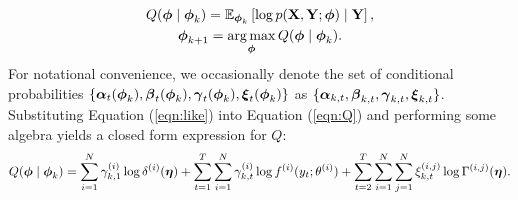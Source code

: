 \begin{gather}
    Q(\boldsymbol{\phi} \mid \boldsymbol{\phi}_{k}) = \mathbb{E}_{\boldsymbol{\phi}_{k}}\left[\log p(\mathbf{X},\mathbf{Y};\boldsymbol{\phi}) \mid \mathbf{Y} \right] \label{eqn:Q}, \\
    \boldsymbol{\phi}_{k+1} = \operatorname*{arg\,max}_{\boldsymbol{\phi}} Q(\boldsymbol{\phi} \mid \boldsymbol{\phi}_{k}). \label{eqn:BW_update}
\end{gather}
%
For notational convenience, we occasionally denote the set of conditional probabilities $\{\boldsymbol{\alpha}_t(\boldsymbol{\phi}_k), \boldsymbol{\beta}_t(\boldsymbol{\phi}_k), \boldsymbol{\gamma}_t(\boldsymbol{\phi}_k), \boldsymbol{\xi}_t(\boldsymbol{\phi}_k)\}$ as $\{\boldsymbol{\alpha}_{k,t},\boldsymbol{\beta}_{k,t},\boldsymbol{\gamma}_{k,t},\boldsymbol{\xi}_{k,t}\}$. Substituting Equation (\ref{eqn:like}) into Equation (\ref{eqn:Q}) and performing some algebra yields a closed form expression for $Q$: %
\begin{equation}
    Q(\bfphi \mid \bfphi_{k}) %
    = \sum_{i=1}^N \gamma^{(i)}_{k,1} \log \delta^{(i)}(\bfeta) + \sum_{t = 1}^T \sum_{i=1}^N \gamma^{(i)}_{k,t} \log f^{(i)}(y_t;\theta^{(i)}) + \sum_{t=2}^{T} \sum_{i=1}^N \sum_{j=1}^N \xi^{(i,j)}_{k,t} \log \Gamma^{(i,j)}(\bfeta).
    \label{eqn:Q_sum}
\end{equation}
%
